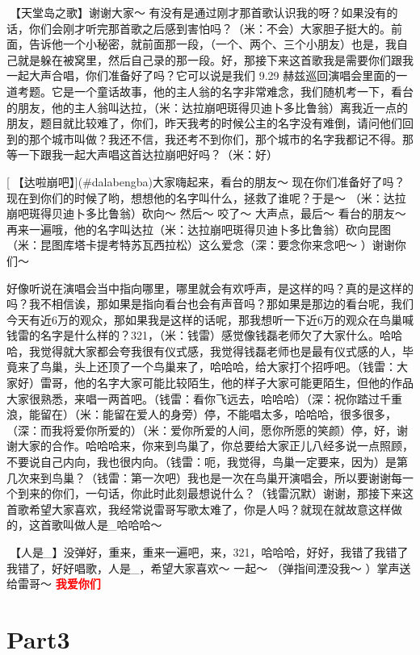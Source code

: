 \documentclass[
]{book}
\begin{document}
🎵【天堂岛之歌】谢谢大家～
有没有是通过刚才那首歌认识我的呀？如果没有的话，你们会刚才听完那首歌之后感到害怕吗？（米：不会）大家胆子挺大的。前面，告诉他一个小秘密，就前面那一段，（一个、两个、三个小朋友）也是，我自己就是躲在被窝里，然后自己录的那一段。好，那接下来这首歌我是需要你们跟我一起大声合唱，你们准备好了吗？它可以说是我们 9.29 赫兹巡回演唱会里面的一道考题。它是一个童话故事，他的主人翁的名字非常难念，我们随机考一下，看台的朋友，他的主人翁叫达拉，（米：达拉崩吧斑得贝迪卜多比鲁翁）离我近一点的朋友，题目就比较难了，你们，昨天我考的时候公主的名字没有难倒，请问他们回到的那个城市叫做？我还不信，我还考不到你们，那个城市的名字我都记不得。那等一下跟我一起大声唱这首达拉崩吧好吗？（米：好）

[🎵【达啦崩吧】](#dalabengba)大家嗨起来，看台的朋友～ 现在你们准备好了吗？现在到你们的时候了哟，想想他的名字叫什么，拯救了谁呢？于是～ （米：达拉崩吧斑得贝迪卜多比鲁翁）砍向～ 然后～ 咬了～ 大声点，最后～ 看台的朋友～ 再来一遍哦，他的名字叫达拉（米：达拉崩吧斑得贝迪卜多比鲁翁）砍向昆图（米：昆图库塔卡提考特苏瓦西拉松）这么爱念（深：要念你来念吧～ ）谢谢你们～

好像听说在演唱会当中指向哪里，哪里就会有欢呼声，是这样的吗？真的是这样的吗？我不相信诶，那如果是指向看台也会有声音吗？那如果是那边的看台呢，我们今天有近6万的观众，那如果我是这样的话呢，那我想听一下近6万的观众在鸟巢喊钱雷的名字是什么样的？321，（米：钱雷）感觉像钱磊老师欠了大家什么。哈哈哈，我觉得就大家都会夸我很有仪式感，我觉得钱磊老师也是最有仪式感的人，毕竟来了鸟巢，头上还顶了一个鸟巢来了，哈哈哈，给大家打个招呼吧。（钱雷：大家好）雷哥，他的名字大家可能比较陌生，他的样子大家可能更陌生，但他的作品大家很熟悉，来唱一两首吧。（钱雷：看你飞远去，哈哈哈）（深：祝你踏过千重浪，能留在）（米：能留在爱人的身旁）停，不能唱太多，哈哈哈，很多很多，（深：而我将爱你所爱的）（米：爱你所爱的人间，愿你所愿的笑颜）停，好，谢谢大家的合作。哈哈哈来，你来到鸟巢了，你总要给大家正儿八经多说一点照顾，不要说自己内向，我也很内向。（钱雷：呃，我觉得，鸟巢一定要来，因为）是第几次来到鸟巢？（钱雷：第一次吧）我也是一次在鸟巢开演唱会，所以要谢谢每一个到来的你们，一句话，你此时此刻最想说什么？（钱雷沉默）谢谢，那接下来这首歌希望大家喜欢，我经常说雷哥写歌太难了，你是人吗？就现在就故意这样做的，这首歌叫做人是\_哈哈哈～

🎵【人是\_】没弹好，重来，重来一遍吧，来，321，哈哈哈，好好，我错了我错了我错了，好好唱歌，人是\_，希望大家喜欢～ 一起～ （弹指间湮没我～ ）掌声送给雷哥～ \textbf{\textcolor{red}{我爱你们~} }

\section{Part3}\label{beijing-20240922-part3}
\end{document}

